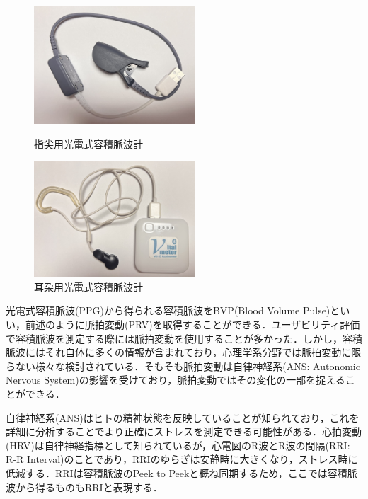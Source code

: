 \begin{figure}[htbp]
\begin{minipage}{0.5\hsize}
    \begin{center}
       \includegraphics[width=60mm]{img/device2.jpg}
    \end{center}
    \caption{指尖用光電式容積脈波計}
    \label{fig:device2}
  \end{minipage}
  \begin{minipage}{0.5\hsize}
    \begin{center}
       \includegraphics[width=60mm]{img/device1.jpg}
    \end{center}
    \caption{耳朶用光電式容積脈波計}
    \label{fig:device1}
  \end{minipage}
\end{figure}

光電式容積脈波(PPG)から得られる容積脈波をBVP(Blood Volume Pulse)といい，前述のように脈拍変動(PRV)を取得することができる．ユーザビリティ評価で容積脈波を測定する際には脈拍変動を使用することが多かった．しかし，容積脈波にはそれ自体に多くの情報が含まれており，心理学系分野では脈拍変動に限らない様々な検討されている．そもそも脈拍変動は自律神経系(ANS: Autonomic Nervous System)の影響を受けており，脈拍変動ではその変化の一部を捉えることができる\cite{peper}．

自律神経系(ANS)はヒトの精神状態を反映していることが知られており，これを詳細に分析することでより正確にストレスを測定できる可能性がある．心拍変動(HRV)は自律神経指標として知られているが，心電図のR波とR波の間隔(RRI: R-R Interval)のことであり，RRIのゆらぎは安静時に大きくなり，ストレス時に低減する\cite{nakagawa}．RRIは容積脈波のPeek to Peekと概ね同期するため，ここでは容積脈波から得るものもRRIと表現する．

